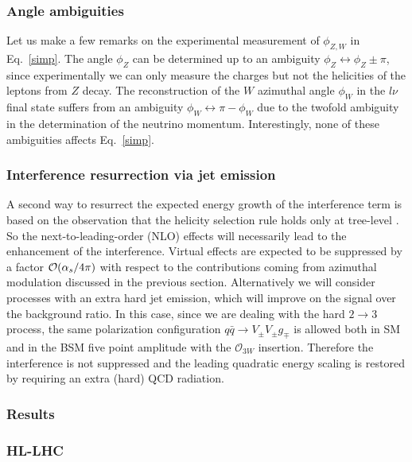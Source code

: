\documentclass[../report.tex]{subfiles}
\begin{document}
 
\subsubsection*{Angle ambiguities \cite{Panico:2017frx}} 
 
 Let us make a few remarks on the experimental measurement  of $\phi_{Z,W}$ in Eq.~\ref{simp}.
 The angle $\phi_Z$  can be determined up to an ambiguity  $\phi_Z\leftrightarrow \phi_Z \pm \pi$,
 since experimentally we can only measure the charges but not the helicities of the  leptons from $Z$  decay.
 The reconstruction of the $W$  azimuthal  angle $\phi_W$ in the $l\nu$ final state  suffers from an ambiguity  $\phi_W \leftrightarrow \pi-\phi_W$ due to the twofold ambiguity in the determination of the neutrino momentum.
Interestingly, none of these ambiguities  affects  Eq.~\ref{simp}.

\subsubsection*{Interference resurrection via jet emission}
 \label{jetsol}
 
A second way to resurrect the expected energy growth of the 
interference term is based on the observation that the helicity 
selection rule holds only at tree-level \cite{Azatov:2017kzw}. 
So the next-to-leading-order (NLO) effects will necessarily lead to the 
enhancement of the interference.
Virtual effects are expected to be suppressed by a factor ${\cal{O}}( 
\alpha_s/4\pi)$ with respect to the contributions coming from 
azimuthal modulation discussed in the previous section.
Alternatively we will consider processes with an extra hard jet emission, which will improve on the  signal over the  background ratio. 
 In this case,  since   we are dealing with the hard
  $2\to 3$ process,
 the same polarization configuration $q\bar{q}\to V_{\pm}V_{\pm}g_{\mp}$ is allowed both in SM and in the BSM five point amplitude with the $\mathcal{O}_{3W}$ insertion. Therefore the interference is not suppressed and the leading quadratic energy scaling is restored by requiring an extra (hard) QCD radiation.


\subsubsection{Results}
\label{res}

\subsubsection*{HL-LHC}
\end{document}
